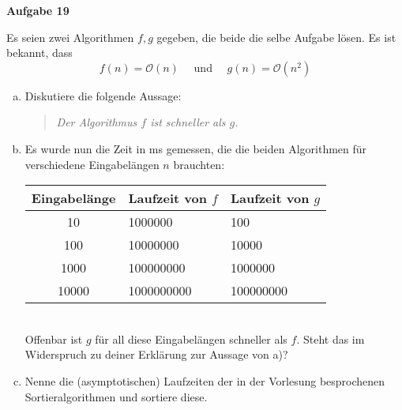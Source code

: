 \documentclass[a4paper,12pt,parskip=full]{scrartcl}
\newcommand{\Aufgabe}[1]{
  {
    \vspace*{0.5cm}
    \textsf{\textbf{Aufgabe #1}}
    \vspace*{0.2cm}
    
  }
}
\begin{document}
\Aufgabe{19} Es seien zwei Algorithmen $f, g$ gegeben, die beide die
selbe Aufgabe lösen. Es ist bekannt, dass
$$ f(n) = \mathcal{O}(n) \quad \text{ und } \quad g(n) = \mathcal{O}(n^2)  $$
\begin{enumerate}[a)]
\item Diskutiere die folgende Aussage:
  \begin{quote}
    \emph{Der Algorithmus $f$ ist schneller als $g$.}
  \end{quote}

\item Es wurde nun die Zeit in ms gemessen, die die beiden Algorithmen für
  verschiedene Eingabelängen $n$ brauchten:
  \begin{table}[h!]
    \centering
    \begin{tabular}[h!]{c | l | l}
      Eingabelänge & Laufzeit von $f$ & Laufzeit von $g$ \\ \hline
      10    & 1000000    & 100  \\
      100   & 10000000   & 10000  \\
      1000  & 100000000  & 1000000  \\
      10000 & 1000000000 & 100000000  \\
    \end{tabular}
  \end{table}
  \\
  Offenbar ist $g$ für all diese Eingabelängen schneller als
  $f$. Steht das im Widerspruch zu deiner Erklärung zur Aussage von
  a)?

\item Nenne die (asymptotischen) Laufzeiten der in der Vorlesung besprochenen Sortieralgorithmen und
  sortiere diese. 
\end{enumerate}
\end{document}
